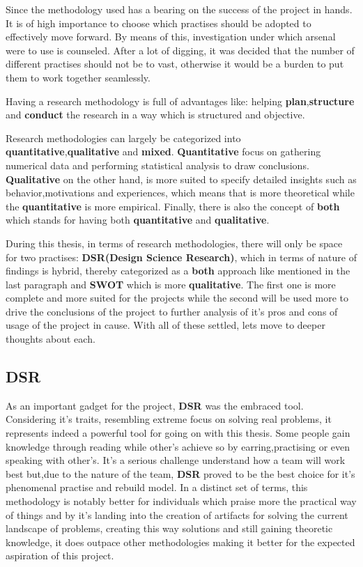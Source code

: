 Since the methodology used has a bearing on the success of the project in hands. It is of high importance to choose which practises should be adopted to effectively move forward. By means of this, investigation under which arsenal were to use is counseled. After a lot of digging, it was decided that the number of different practises should not be to vast, otherwise it would be a burden to put them to work together seamlessly. 

Having a research methodology is full of advantages like: helping \textbf{plan},\textbf{structure} and \textbf{conduct} the research in a way which is structured and objective. 

Research methodologies can largely be categorized into \textbf{quantitative},\textbf{qualitative} and \textbf{mixed}. \textbf{Quantitative} focus on gathering numerical data and performing statistical analysis to draw conclusions. \textbf{Qualitative} on the other hand, is more suited to specify detailed insights such as behavior,motivations and experiences, which means that is more theoretical while the \textbf{quantitative} is more empirical. Finally, there is also the concept of \textbf{both} which stands for having both \textbf{quantitative} and \textbf{qualitative}.

During this thesis, in terms of research methodologies, there will only be space for two practises:  \textbf{DSR(Design Science Research)}, which in terms of nature of findings is hybrid, thereby categorized as a \textbf{both} approach like mentioned in the last paragraph and \textbf{SWOT} which is more \textbf{qualitative}. The first one is more complete and more suited for the projects while the second will be used more to drive the conclusions of the project to further analysis of it's pros and cons of usage of the project in cause. With all of these settled, lets move to deeper thoughts about each.

%
%
%
%
\subsection{DSR}
As an important gadget for the project, \textbf{DSR}  was the embraced tool. Considering it's traits, resembling extreme focus on solving real problems, it represents indeed a powerful tool for going on with this thesis. Some people gain knowledge through reading while other's achieve so by earring,practising or even speaking with other's. It's a serious challenge understand how a team will work best but,due to the nature of the team, \textbf{DSR} proved to be the best choice for it's phenomenal practise and rebuild model. In a distinct set of terms, this methodology is notably better for individuals which praise more the practical way of things and by it's landing into the creation of artifacts for solving the current landscape of problems, creating this way solutions and still gaining theoretic knowledge, it does outpace other methodologies making it better for the expected aspiration of this project.

